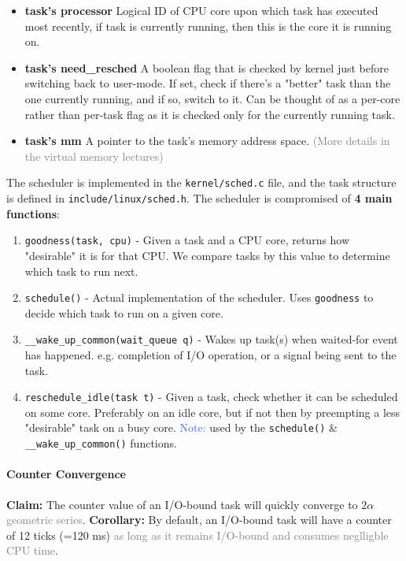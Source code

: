 \documentclass[openany,12pt]{book}
\newcommand{\code}[1]{\texttt{#1}}
\newcommand{\blue}[1]{\textcolor{RoyalBlue}{#1}}
\newcommand{\gray}[1]{\textcolor{gray}{#1}}
\begin{document}
\begin{itemize}
\begin{samepage}
        \end{samepage}

  \item \textbf{task's processor} Logical ID of CPU core upon which task has executed most recently, if task is currently running, then this is the core it is running on.

  \item \textbf{task's need\_resched} A boolean flag that is checked by kernel just before switching back to user-mode. If set, check if there's a "better" task than the one currently running, and if so, switch to it. Can be thought of as a per-core rather than per-task flag as it is checked only for the currently running task.

  \item \textbf{task's mm} A pointer to the task's memory address space. \gray{(More details in the virtual memory lectures)}
\end{itemize}


The scheduler is implemented in the \code{kernel/sched.c} file, and the task structure is defined in \code{include/linux/sched.h}. The scheduler is compromised of \textbf{4 main functions}:
\begin{enumerate}
  \item \code{goodness(task, cpu)} - Given a task and a CPU core, returns how "desirable" it is for that CPU. We compare tasks by this value to determine which task to run next.
  \item \code{schedule()} - Actual implementation of the scheduler. Uses \code{goodness} to decide which task to run on a given core.
  \item \code{\_\_wake\_up\_common(wait\_queue q)} - Wakes up task(s) when waited-for event has happened. e.g. completion of I/O operation, or a signal being sent to the task.
  \item \code{reschedule\_idle(task t)} - Given a task, check whether it can be scheduled on some core. Preferably on an idle core, but if not then by preempting a less "desirable" task on a busy core. \blue{Note:} used by the \code{schedule()} \& \code{\_\_wake\_up\_common()} functions.
\end{enumerate}

\paragraph{Counter Convergence} \textbf{Claim:} The counter value of an I/O-bound task will quickly converge to \(2\alpha\) \gray{geometric series}.
\textbf{Corollary:} By default, an I/O-bound task will have a counter of 12 ticks (=120 ms) \gray{as long as it remains I/O-bound and consumes neglligble CPU time}.
\end{document}

